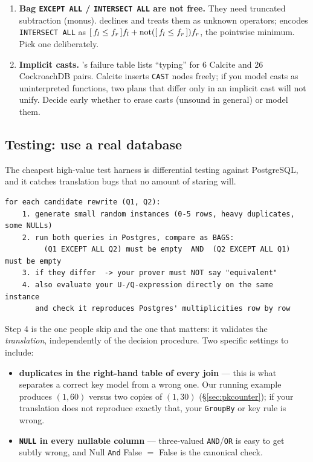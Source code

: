 \begin{enumerate}
\item \textbf{Bag \lstinline|EXCEPT ALL| / \lstinline|INTERSECT ALL| are not free.} They need
      truncated subtraction (monus). \QED{} declines and treats them as unknown operators;
      \sqlsolver{} encodes \lstinline|INTERSECT ALL| as
      $[\,f_l\le f_r\,]f_l+\mathrm{not}([\,f_l\le f_r\,])f_r$, the pointwise minimum. Pick one
      deliberately.

\item \textbf{Implicit casts.} \QED{}'s failure table lists ``typing'' for 6 Calcite and 26
      CockroachDB pairs. Calcite inserts \texttt{CAST} nodes freely; if you model casts as
      uninterpreted functions, two plans that differ only in an implicit cast will not
      unify. Decide early whether to erase casts (unsound in general) or model them.
\end{enumerate}

\subsection{Testing: use a real database}

The cheapest high-value test harness is differential testing against PostgreSQL, and it
catches translation bugs that no amount of staring will.

\begin{lstlisting}[style=pseudo]
for each candidate rewrite (Q1, Q2):
    1. generate small random instances (0-5 rows, heavy duplicates, some NULLs)
    2. run both queries in Postgres, compare as BAGS:
         (Q1 EXCEPT ALL Q2) must be empty  AND  (Q2 EXCEPT ALL Q1) must be empty
    3. if they differ  -> your prover must NOT say "equivalent"
    4. also evaluate your U-/Q-expression directly on the same instance
       and check it reproduces Postgres' multiplicities row by row
\end{lstlisting}

Step 4 is the one people skip and the one that matters: it validates the \emph{translation},
independently of the decision procedure. Two specific settings to include:

\begin{itemize}
\item \textbf{duplicates in the right-hand table of every join} --- this is what separates a
      correct key model from a wrong one. Our running example produces $(1,60)$ versus two
      copies of $(1,30)$ (\S\ref{sec:pkcounter}); if your translation does not reproduce
      exactly that, your \texttt{GroupBy} or key rule is wrong.
\item \textbf{\lstinline|NULL| in every nullable column} --- three-valued \texttt{AND}/\texttt{OR}
      is easy to get subtly wrong, and \textsf{Null} \texttt{And} \textsf{False} $=$
      \textsf{False} is the canonical check.
\end{itemize}

